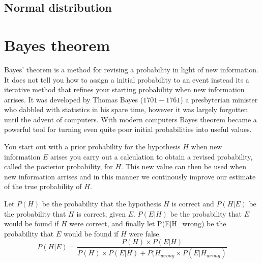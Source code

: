 \subsection{Normal distribution}

\section{Bayes theorem}
Bayes’ theorem is a method for revising a probability in light of new information. It does not tell you how to assign a initial probability to an event instead its a iterative method that refines your starting probability when new information arrises. It was developed by Thomas Bayes ($1701-1761$) a presbyterian minister who dabbled with statistics in his spare time, however it was largely forgotten until the advent of computers. With modern computers Bayes theorem became a powerful tool for turning even quite poor initial probabilities into useful values.


You start out with a prior probability for the hypothesis $H$ when new information $E$ arises you carry out a calculation to obtain a revised probability, called the posterior probability, for $H$. This new value can then be used when new information arrises and in this manner we continously improve our estimate of the true probability of $H$.

Let $P(H)$ be the probability that the hypothesis $H$ is correct and $P(H|E)$ be the probability that $H$ is correct, given $E$. $P(E|H)$ be the probability that $E$ would be found if $H$ were correct, and finally let P(E|H_{wrong}) be the probability that $E$ would be found if $H$ were false.
\[
P(H|E) = \frac{P(H) \times P(E|H)}{P(H) \times P(E|H) + P(H_{wrong} \times P(E|H_{wrong})}
\]

